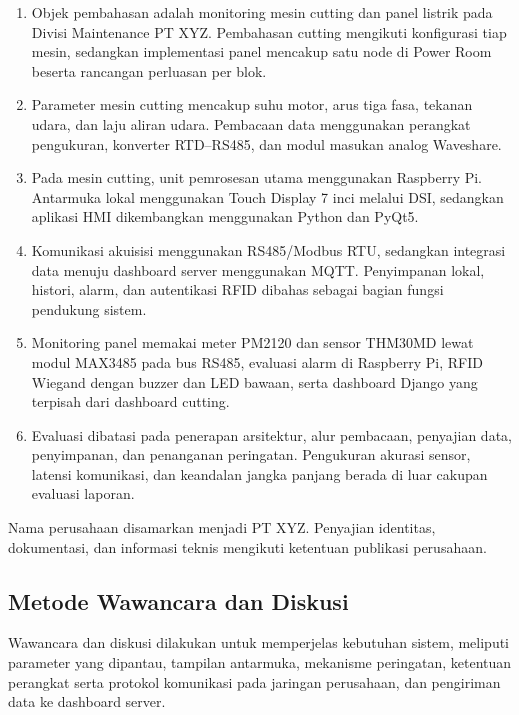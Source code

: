 \begin{enumerate}[leftmargin=*,itemsep=2pt]
\item Objek pembahasan adalah monitoring mesin cutting dan panel listrik pada Divisi Maintenance PT XYZ. Pembahasan cutting mengikuti konfigurasi tiap mesin, sedangkan implementasi panel mencakup satu node di Power Room beserta rancangan perluasan per blok.

\item Parameter mesin cutting mencakup suhu motor, arus tiga fasa, tekanan udara, dan laju aliran udara. Pembacaan data menggunakan perangkat pengukuran, konverter RTD--RS485, dan modul masukan analog Waveshare.

\item Pada mesin cutting, unit pemrosesan utama menggunakan Raspberry Pi. Antarmuka lokal menggunakan Touch Display 7 inci melalui DSI, sedangkan aplikasi HMI dikembangkan menggunakan Python dan PyQt5.

\item Komunikasi akuisisi menggunakan RS485/Modbus RTU, sedangkan integrasi data menuju dashboard server menggunakan MQTT. Penyimpanan lokal, histori, alarm, dan autentikasi RFID dibahas sebagai bagian fungsi pendukung sistem.

\item Monitoring panel memakai meter PM2120 dan sensor THM30MD lewat modul MAX3485 pada bus RS485, evaluasi alarm di Raspberry Pi, RFID Wiegand dengan buzzer dan LED bawaan, serta dashboard Django yang terpisah dari dashboard cutting.

\item Evaluasi dibatasi pada penerapan arsitektur, alur pembacaan, penyajian data, penyimpanan, dan penanganan peringatan. Pengukuran akurasi sensor, latensi komunikasi, dan keandalan jangka panjang berada di luar cakupan evaluasi laporan.

\end{enumerate}

Nama perusahaan disamarkan menjadi PT XYZ. Penyajian identitas, dokumentasi, dan informasi teknis mengikuti ketentuan publikasi perusahaan.

\subsection{Metode Wawancara dan Diskusi}

Wawancara dan diskusi dilakukan untuk memperjelas kebutuhan sistem, meliputi parameter yang dipantau, tampilan antarmuka, mekanisme peringatan, ketentuan perangkat serta protokol komunikasi pada jaringan perusahaan, dan pengiriman data ke dashboard server.

